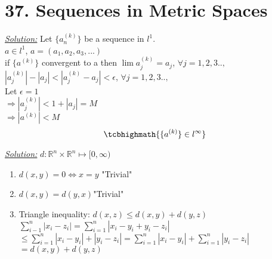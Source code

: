 \documentclass{book}
\begin{document}
\section{37. Sequences in Metric Spaces}
\begin{tcolorbox}[enhanced,attach boxed title to top center={yshift=-3mm,yshifttext=-1mm},
colback=blue!5!white,colframe=blue!75!black,colbacktitle=red!80!black,
title=Exercise 37.7:,fonttitle=\bfseries,
boxed title style={size=small,colframe=red!50!black} ]
\textit{\color{blue}\underline{Solution:}}
Let $\{a_n^{(k)}\}$ be a sequence in $l^1$.\\
$a\in l^1$, $a=(a_1,a_2,a_3,...)$\\
if $\{a^{(k)}\}$ convergent to a then $\lim a_j^{(k)}=a_j$, $\forall j=1,2,3..,$\\
$|a_j^{(k)}|-|a_j|<|a_j^{(k)}-a_j|<\epsilon$, $\forall j=1,2,3..,$\\
Let $\epsilon =1$\\
$\Rightarrow|a_j^{(k)}|<1+|a_j|=M$\\
$\Rightarrow |a^{(k)}|<M$
$$\tcbhighmath{\{a^{(k)}\}\in l^\infty}$$
\end{tcolorbox}



\begin{tcolorbox}[enhanced,attach boxed title to top center={yshift=-3mm,yshifttext=-1mm},
colback=blue!5!white,colframe=blue!75!black,colbacktitle=red!80!black,
title=Exercise 37.9 (a): ,fonttitle=\bfseries,
boxed title style={size=small,colframe=red!50!black} ]
\textit{\color{blue}\underline{Solution:}}
$d:\mathbb{R}^n\times \mathbb{R}^n\longmapsto[0,\infty )$
\begin{enumerate}
\item $d(x,y)=0\Leftrightarrow x=y$ {\color{red}"Trivial"} 
\item $d(x,y)=d(y,x)${\color{red}"Trivial"}
\item Triangle inequality: $d(x,z)\leq d(x,y)+d(y,z)$\\
$\sum_{i-1}^{n}|x_i-z_i|=\sum_{i=1}^{n}|x_i-y_i+y_i-z_i|$
$\leq \sum_{i=1}^{n}|x_i-y_i|+|y_i-z_i|= \sum_{i=1}^{n}|x_i-y_i|+\sum_{i=1}^{n}|y_i-z_i|$
$=d(x,y)+d(y,z)$

\end{enumerate}
\end{tcolorbox}

\end{document}
